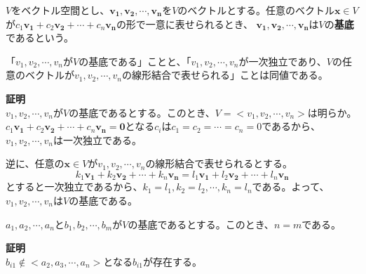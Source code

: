 \documentclass{jlreq}
\begin{document}
\begin{definitionbox}[基底]
  $V$をベクトル空間とし、$\boldsymbol{v_1}, \boldsymbol{v_2}, \cdots, \boldsymbol{v_n}$を$V$のベクトルとする。任意のベクトル$\boldsymbol{x} \in V$が$c_1 \boldsymbol{v_1} + c_2 \boldsymbol{v_2} + \cdots + c_n \boldsymbol{v_n}$の形で一意に表せられるとき、
  $\boldsymbol{v_1}, \boldsymbol{v_2}, \cdots, \boldsymbol{v_n}$は$V$の\textbf{基底}であるという。 \\
\end{definitionbox}

\begin{theorembox}[定理3]
  「$v_1, v_2, \cdots, v_n$が$V$の基底である」ことと、「$v_1, v_2, \cdots, v_n$が一次独立であり、$V$の任意のベクトルが$v_1, v_2, \cdots, v_n$の線形結合で表せられる」ことは同値である。

  \dotfill

  \textbf{証明} \\

  $v_1, v_2, \cdots, v_n$が$V$の基底であるとする。このとき、$V = <v_1, v_2, \cdots, v_n>$は明らか。
  $c_1 \boldsymbol{v_1} + c_2 \boldsymbol{v_2} + \cdots + c_n \boldsymbol{v_n} = \boldsymbol{0}$となる$c_i$は$c_1 = c_2 = \cdots = c_n = 0$であるから、$v_1, v_2, \cdots, v_n$は一次独立である。

  逆に、任意の$\boldsymbol{x} \in V$が$v_1, v_2, \cdots, v_n$の線形結合で表せられるとする。
  \begin{equation*}
    k_1 \boldsymbol{v_1} + k_2 \boldsymbol{v_2} + \cdots + k_n \boldsymbol{v_n} = l_1 \boldsymbol{v_1} + l_2 \boldsymbol{v_2} + \cdots + l_n \boldsymbol{v_n}
  \end{equation*}
  とすると一次独立であるから、$k_1 = l_1, k_2 = l_2, \cdots, k_n = l_n$である。よって、$v_1, v_2, \cdots, v_n$は$V$の基底である。
\end{theorembox}

\begin{theorembox}[定理4]
  $a_1, a_2, \cdots, a_n$と$b_1, b_2, \cdots, b_m$が$V$の基底であるとする。このとき、$n = m$である。

  \dotfill

  \textbf{証明} \\

  $b_{i1} \notin <a_2, a_3, \cdots, a_n>$となる$b_{i1}$が存在する。
\end{theorembox}

\begin{definitionbox}

\end{definitionbox}
\end{document}
